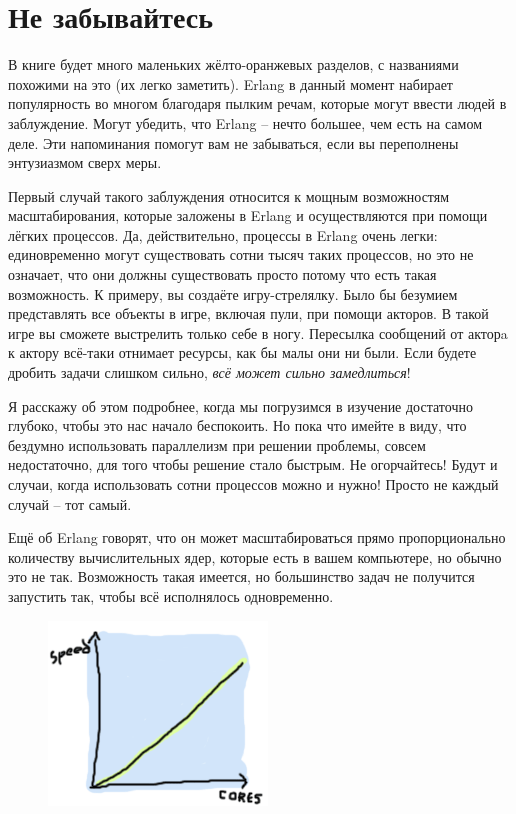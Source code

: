 \documentclass[a4paper,12pt]{report}
\begin{document}
\section{Не забывайтесь}
В книге будет много маленьких жёлто\--оранжевых разделов, с названиями похожими на это (их легко заметить). Erlang в данный момент набирает популярность во многом благодаря пылким речам, которые могут ввести людей в заблуждение. Могут убедить, что Erlang \--- нечто большее, чем есть на самом деле. Эти напоминания помогут вам не забываться, если вы переполнены энтузиазмом сверх меры.

Первый случай такого заблуждения относится к мощным возможностям масштабирования, которые заложены в Erlang и осуществляются при помощи лёгких процессов. Да, действительно, процессы в Erlang очень легки: единовременно могут существовать сотни тысяч таких процессов, но это не означает, что они должны существовать просто потому что есть такая возможность. К примеру, вы создаёте игру\--стрелялку. Было бы безумием представлять все объекты в игре, включая пули, при помощи акторов. В такой игре вы сможете выстрелить только себе в ногу. Пересылка сообщений от акторa к актору всё\--таки отнимает ресурсы, как бы малы они ни были. Если будете дробить задачи слишком сильно, \emph{всё может сильно замедлиться}!

Я расскажу об этом подробнее, когда мы погрузимся в изучение достаточно глубоко, чтобы это нас начало беспокоить. Но пока что имейте в виду, что бездумно использовать параллелизм при решении проблемы, совсем недостаточно, для того чтобы решение стало быстрым. Не огорчайтесь! Будут и случаи, когда использовать сотни процессов можно и нужно! Просто не каждый случай \--- тот самый.

Ещё об Erlang говорят, что он может масштабироваться прямо пропорционально количеству вычислительных ядер, которые есть в вашем компьютере, но обычно это не так. Возможность такая имеется, но большинство задач не получится запустить так, чтобы всё исполнялось одновременно.
\begin{figure}
    \includegraphics[width=1\linewidth]{scaling.png}
\end{figure}
\end{document}
